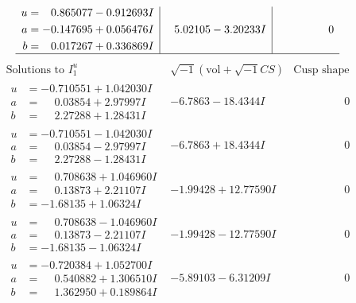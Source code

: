 \documentclass[1p]{elsarticle_modified}
\theoremstyle{definition}
\newcommand{\I}{\sqrt{-1}}
\begin{document}
$$\begin{array}{c|c|c}
\begin{aligned}
u &= \phantom{-}0.865077 - 0.912693 I \\
a &= -0.147695 + 0.056476 I \\
b &= \phantom{-}0.017267 + 0.336869 I\end{aligned}
 & \phantom{-}5.02105 - 3.20233 I & \phantom{-0.000000 } 0\\
 \hline 
 \end{array}$$\newpage$$\begin{array}{c|c|c}  
\text{Solutions to }I^u_{1}& \I (\text{vol} + \sqrt{-1}CS) & \text{Cusp shape}\\
 \hline 
\begin{aligned}
u &= -0.710551 + 1.042030 I \\
a &= \phantom{-}0.03854 + 2.97997 I \\
b &= \phantom{-}2.27288 + 1.28431 I\end{aligned}
 & -6.7863 - 18.4344 I & \phantom{-0.000000 } 0 \\ \hline\begin{aligned}
u &= -0.710551 - 1.042030 I \\
a &= \phantom{-}0.03854 - 2.97997 I \\
b &= \phantom{-}2.27288 - 1.28431 I\end{aligned}
 & -6.7863 + 18.4344 I & \phantom{-0.000000 } 0 \\ \hline\begin{aligned}
u &= \phantom{-}0.708638 + 1.046960 I \\
a &= \phantom{-}0.13873 + 2.21107 I \\
b &= -1.68135 + 1.06324 I\end{aligned}
 & -1.99428 + 12.77590 I & \phantom{-0.000000 } 0 \\ \hline\begin{aligned}
u &= \phantom{-}0.708638 - 1.046960 I \\
a &= \phantom{-}0.13873 - 2.21107 I \\
b &= -1.68135 - 1.06324 I\end{aligned}
 & -1.99428 - 12.77590 I & \phantom{-0.000000 } 0 \\ \hline\begin{aligned}
u &= -0.720384 + 1.052700 I \\
a &= \phantom{-}0.540882 + 1.306510 I \\
b &= \phantom{-}1.362950 + 0.189864 I\end{aligned}
 & -5.89103 - 6.31209 I & \phantom{-0.000000 } 0 \\ \hline\begin{aligned}

\end{aligned}
\end{array}$$
\end{document}
